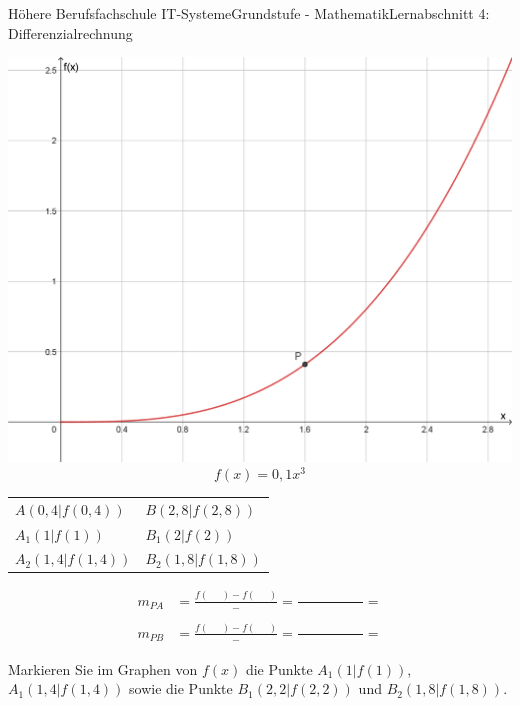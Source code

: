 \documentclass[oneside,openany,headings=optiontotoc,11pt,numbers=noenddot]{scrreprt}
\begin{document}
	\begin{worksheet}{Höhere Berufsfachschule IT-Systeme}{Grundstufe - Mathematik}{Lernabschnitt 4: Differenzialrechnung}
		\begin{framed}
			\noindent
			\includegraphics[width=\textwidth]{../99_Bilder/20190205.png}\\
			\[f(x) = 0,1x^3\]
			\begin{tabularx}{\textwidth}{MM}
				\(A(0,4|f(0,4))\) & \(B(2,8|f(2,8))\)\\
				\(A_1(1|f(1))\) & \(B_1(2|f(2))\)\\
				\(A_2(1,4|f(1,4))\) & \(B_2(1,8|f(1,8))\)
			\end{tabularx}
		\end{framed}
		\renewcommand{\arraystretch}{1.5}
		\begin{framed}
			\noindent
			\begin{align*}
				m_{PA} & = \frac{f(\ \ \ \ \ \ ) - f(\ \ \ \ \ \ )}{\ \ \ \ \ \ -\ \ \ \ \ \ } = \frac{\ \ \ \ \ \ \ \ \ \ \ \ \ \ \ \ \ \ \ \ \ \ \ \ \ \ \ \ \ \ }{\ \ \ \ \ \ \ \ \ \ \ \ \ \ \ \ \ \ \ \ \ \ \ \ } = \\
				\\
				m_{PB} & = \frac{f(\ \ \ \ \ \ ) - f(\ \ \ \ \ \ )}{\ \ \ \ \ \ -\ \ \ \ \ \ } = \frac{\ \ \ \ \ \ \ \ \ \ \ \ \ \ \ \ \ \ \ \ \ \ \ \ \ \ \ \ \ \ }{\ \ \ \ \ \ \ \ \ \ \ \ \ \ \ \ \ \ \ \ \ \ \ \ } = 
			\end{align*}
		\end{framed}
		\begin{framed}
			\noindent
			Markieren Sie im Graphen von \(f(x)\) die Punkte \(A_1(1|f(1))\), \(A_1(1,4|f(1,4))\) sowie die Punkte \(B_1(2,2|f(2,2))\) und \(B_2(1,8|f(1,8))\).\\

\end{framed}
\end{worksheet}
\end{document}
